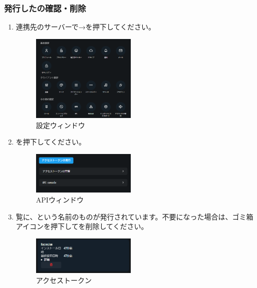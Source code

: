        \subsubsection{発行した\accessToken の確認・削除}
        \label{sec:misskey4}
            \begin{enumerate}
                \item 連携先の\mi サーバーで→を押下してください。
                    \begin{figure}[htbp]
                        \centering
                        \includegraphics[width=5cm]{./pictures/misskey8.png}
                        \caption{設定ウィンドウ}
                        \label{img:misskey8}
                    \end{figure}

                \item {}を押下してください。
                    \begin{figure}[htbp]
                        \centering
                        \includegraphics[width=5cm]{./pictures/misskey9.png}
                        \caption{APIウィンドウ}
                        \label{img:misskey9}
                    \end{figure}

                \item \accessToken 覧に、\bj という名前のものが発行されています。不要になった場合は、ゴミ箱アイコンを押下して\accessToken を削除してください。
                    \begin{figure}[htbp]
                        \centering
                        \includegraphics[width=5cm]{./pictures/misskey10.png}
                        \caption{アクセストークン}
                        \label{img:misskey10}
                    \end{figure}
            \end{enumerate}